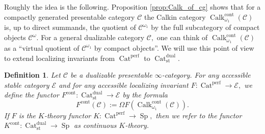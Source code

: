 \documentclass[11pt,leqno]{amsart}
\newtheorem{defi}[theo]{Definition}
\newtheorem{prop}[theo]{Proposition}
\numberwithin{equation}{section}
\newcommand{\Cat}{\operatorname{Cat}}
\newcommand{\cont}{\operatorname{cont}}
\newcommand{\st}{\operatorname{st}}
\newcommand{\dual}{\operatorname{dual}}
\newcommand{\cC}{{\mathcal C}}
\newcommand{\cE}{{\mathcal E}}
\newcommand{\perf}{\operatorname{perf}}
\newcommand{\Sp}{\operatorname{Sp}}
\newcommand{\Ind}{\operatorname{Ind}}
\newcommand{\Calk}{\operatorname{Calk}}
\begin{document}
Roughly the idea is the following. Proposition \ref{prop:Calk_of_cg} shows that for a compactly generated presentable category $\cC$ the Calkin category $\Calk_{\omega_1}^{\cont}(\cC)$ is, up to direct summands, the quotient of $\cC^{\omega_1}$ by the full subcategory of compact objects $\cC^{\omega}.$ For a general dualizable category $\cC,$ one can think of $\Calk_{\omega_1}^{\cont}(\cC)$ as a ``virtual quotient of $\cC^{\omega_1}$ by compact objects''. We will use this point of view to extend localizing invariants from $\Cat^{\perf}$ to $\Cat_{\st}^{\dual}.$   





\begin{defi}\label{defi:F_cont} Let $\cC$ be a dualizable presentable $\infty$-category. For any accessible stable category $\cE$ and for any accessible localizing invariant $F:\Cat^{\perf}\to\cE,$ we define the functor $F^{\cont}:\Cat_{\st}^{\dual}\to \cE$ by the formula
$$F^{\cont}(\cC):=\Omega F(\Calk_{\omega_1}^{\cont}(\cC)).$$ 
If $F$ is the $K$-theory functor $K:\Cat^{\perf}\to\Sp,$ then we refer to the functor $K^{\cont}:\Cat_{\st}^{\dual}\to\Sp$ as continuous $K$-theory.
\end{defi}
\end{document}
